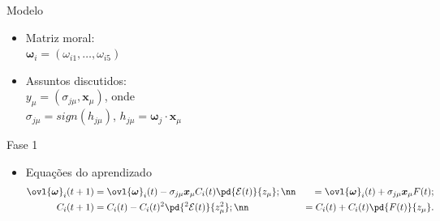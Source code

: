 \documentclass{beamer}
\begin{document}
    \begin{frame}{Modelo}%
       \begin{itemize}
           \item Matriz moral:\\
                 $\bm \omega_i = (\omega_{i 1},\ldots,\omega_{i 5})$

            \item Assuntos discutidos:\\
                $y_\mu=(\sigma_{j\mu},\bm x_\mu)$, onde \\
                $\sigma_{j\mu} =  sign(h_{j\mu})$,
                $h_{j\mu} = \bm \omega_j \cdot \bm x_\mu$

       \end{itemize}

    \end{frame}%

    \begin{frame}{Fase 1}%
        \begin{itemize}
            \item Equações do aprendizado
                \begin{align}
                    \ovl{\bm \omega}_i(t+1) 
                    &= \ovl{\bm \omega}_i(t) - 
                    \sigma_{j\mu} \bm x_\mu C_i(t)\pd{\mathcal E (t)}{z_\mu}; \nn
                    &= \ovl{\bm \omega}_i(t) + \sigma_{j\mu} \bm x_\mu  F(t); 
                    \label{eq:F1}\\
                    C_i(t+1) 
                    &= C_i(t) - C_i(t)^2 \pd{^2 \mathcal E (t)}{z_\mu^2}; \nn
                    &= C_i(t) + C_i(t) \pd{F(t)}{z_\mu}.
                    \label{eq:C}
                \end{align}
        \end{itemize}

   \end{frame}%
\end{document}
